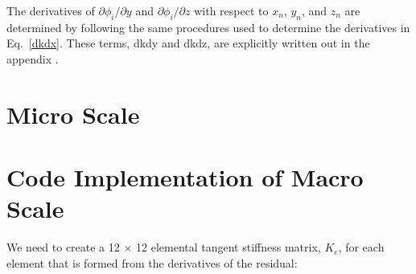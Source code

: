 The derivatives of $\partial \phi_i/\partial y$ and $\partial \phi_i/\partial z$ with respect to $x_n$, $y_n$, and $z_n$ are determined by following the same procedures used to determine the derivatives in Eq.\ \eqref{dkdx}. These terms, dkdy and dkdz, are explicitly written out in the appendix .

\section{Micro Scale}

\section{Code Implementation of Macro Scale}

We need to create a 12 $\times$ 12 elemental tangent stiffness matrix, $K_e$, for each element that is formed from the derivatives of the residual:
%
\setcounter{MaxMatrixCols}{12}

